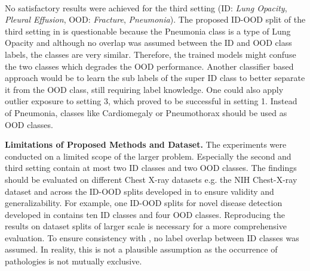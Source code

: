 \\
No satisfactory results were achieved for the third setting (ID: \textit{Lung Opacity}, \textit{Pleural Effusion}, OOD: \textit{Fracture}, \textit{Pneumonia}).
The proposed ID-OOD split of the third setting in \citep{Berger2021} is questionable because the Pneumonia class is a type of Lung Opacity \citep{Hansell2008} and although no overlap was assumed between the ID and OOD class labels, the classes are very similar. 
Therefore, the trained models might confuse the two classes which degrades the OOD performance. 
Another classifier based approach would be to learn the sub labels of the super ID class to better separate it from the OOD class, still requiring label knowledge.
One could also apply outlier exposure to setting 3, which proved to be successful in setting 1.
Instead of Pneumonia, classes like Cardiomegaly or Pneumothorax should be used as OOD classes.
\par
\textbf{Limitations of Proposed Methods and Dataset.}
The experiments were conducted on a limited scope of the larger problem.
Especially the second and third setting contain at most two ID classes and two OOD classes.
The findings should be evaluated on different Chest X-ray datasets e.g. the NIH Chest-X-ray dataset \citep{Wang2017} and across the ID-OOD splits developed in \citep{Cao2020} to ensure validity and generalizability.
For example, one ID-OOD splits for novel disease detection developed in \citep{Cao2020} contains ten ID classes and four OOD classes.
Reproducing the results on dataset splits of larger scale is necessary for a more comprehensive evaluation.
To ensure consistency with \citep{Berger2021}, no label overlap between ID classes was assumed. 
In reality, this is not a plausible assumption as the occurrence of pathologies is not mutually exclusive.
